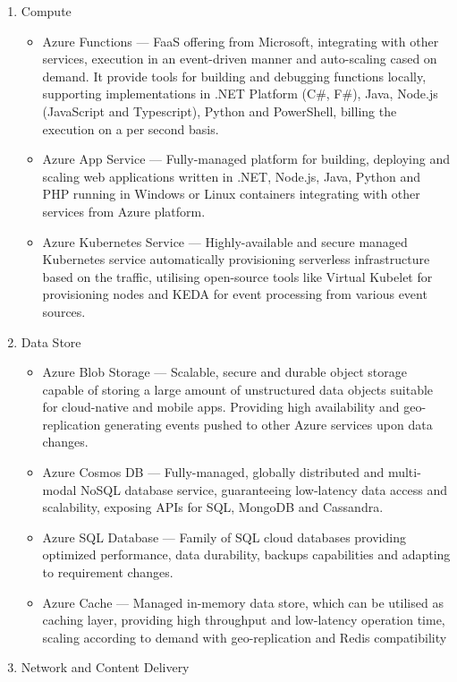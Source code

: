 \begin{enumerate}
   \item Compute
   \begin{itemize}
       \item Azure Functions --- FaaS offering from Microsoft, integrating with other services, execution in an event-driven manner and auto-scaling cased on demand. It provide tools for building and debugging functions locally, supporting implementations in .NET Platform (C\#, F\#), Java, Node.js (JavaScript and Typescript), Python and PowerShell, billing the execution on a per second basis.
       \item Azure App Service --- Fully-managed platform for building, deploying and scaling web applications written in .NET, Node.js, Java, Python and PHP running in Windows or Linux containers integrating with other services from Azure platform.
       \item Azure Kubernetes Service --- Highly-available and secure managed Kubernetes service automatically provisioning serverless infrastructure based on the traffic, utilising open-source tools like Virtual Kubelet for provisioning nodes and KEDA for event processing from various event sources.
   \end{itemize}
   \item Data Store
   \begin{itemize}
       \item Azure Blob Storage --- Scalable, secure and durable object storage capable of storing a large amount of unstructured data objects suitable for cloud-native and mobile apps. Providing high availability and geo-replication generating events pushed to other Azure services upon data changes.
       \item Azure Cosmos DB --- Fully-managed, globally distributed and multi-modal NoSQL database service, guaranteeing low-latency data access and scalability, exposing APIs for SQL, MongoDB and Cassandra.
       \item Azure SQL Database --- Family of SQL cloud databases providing optimized performance, data durability, backups capabilities and adapting to requirement changes.
       \item Azure Cache --- Managed in-memory data store, which can be utilised as caching layer, providing high throughput and low-latency operation time, scaling according to demand with geo-replication and Redis compatibility
   \end{itemize}
   \item Network and Content Delivery

\end{enumerate}
